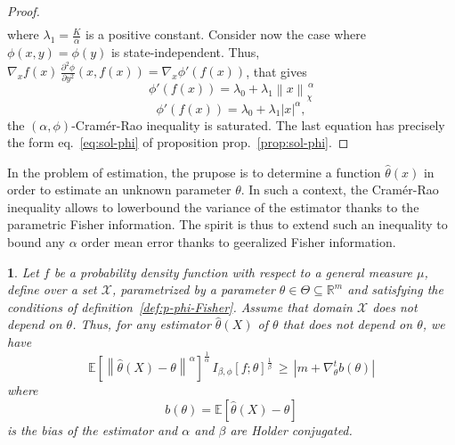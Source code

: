 \documentclass[english,sort&compress]{elsarticle}
\theoremstyle{definition}
\theoremstyle{plain}
\newtheorem{prop}{\protect\propositionname}
\theoremstyle{plain}
\providecommand{\propositionname}{Proposition}
\def\Rset{\mathbb{R}}
\def\X{\mathcal{X}}
\newcommand{\Esp}[1]{\mathbb{E}\left[ #1 \right]}
\begin{document}
\begin{proof}
\begin{eqnarray*}
  \end{eqnarray*}
  where $\lambda_1 = \frac{K}{\alpha}$ is a positive constant.  Consider now the
  case where $\phi(x,y) = \phi(y)$ is state-independent. Thus, $\nabla_x f(x) \,
  \frac{\partial^2  \phi}{\partial y^2} (x,f(x))  = \nabla_x  \phi'(f(x))$, that
  gives
  \[
  \phi'(f(x)) = \lambda_0 + \lambda_1 \left\| x \right\|_\chi^{\, \alpha}
  \]
%
\[
\phi'(f(x)) = \lambda_0 + \lambda_1 |x|^\alpha,
\]
%
the $(\alpha,\phi)$-Cram\'er-Rao inequality is  saturated. The last equation has
precisely      the      form      eq.~\eqref{eq:sol-phi}     of      proposition
prop.~\ref{prop:sol-phi}.
\end{proof}


In  the  problem  of  estimation,   the  prupose  is  to  determine  a  function
$\hat{\theta}(x)$ in order to estimate  an unknown parameter $\theta$. In such a
context, the  Cram\'er-Rao inequality allows  to lowerbound the variance  of the
estimator thanks  to the  parametric Fisher information.  The spirit is  thus to
extend  such an  inequality to  bound any  $\alpha$ order  mean error  thanks to
geeralized Fisher information.
%
\begin{prop}\label{prop:p-phi-CR}
  Let $f$  be a probability density  function with respect to  a general measure
  $\mu$, define over a set $\X$,  parametrized by a parameter $\theta \in \Theta
  \subseteq      \Rset^m$     and      satisfying     the      conditions     of
  definition~\ref{def:p-phi-Fisher}. Assume that domain  $\X$ does not depend on
  $\theta$. Thus, for any  estimator $\widehat{\theta}(X)$ of $\theta$ that does
  not depend on $\theta$, we have
  \begin{equation}\label{eq:phi-CR}
  \Esp{\left\| \widehat{\theta}(X) - \theta \right\|^\alpha}^{\frac{1}{\alpha}} \,
  I_{\beta,\phi}[f;\theta]^{\frac{1}{\beta}} \, \ge \, \left| m + \nabla_\theta^t
   b(\theta)\right|
  \end{equation}
  where
  \begin{equation}
  b(\theta) = \Esp{\widehat{\theta}(X) - \theta}
  \end{equation}
  is the bias of the estimator and $\alpha$ and $\beta$ are Holder conjugated.
\end{prop}
\end{document}
